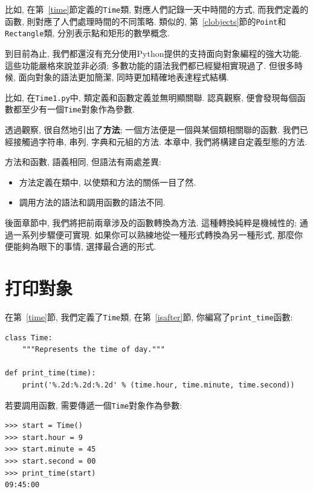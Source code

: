 \documentclass[10pt]{book}
\begin{document}
比如, 在第~\ref{time}節定義的{\tt Time}類, 對應人們記錄一天中時間的方式, 
而我們定義的函數, 則對應了人們處理時間的不同策略. 
類似的, 第~\ref{clobjects}節的{\tt Point}和{\tt Rectangle}類, 
分別表示點和矩形的數學概念. 

到目前為止, 我們都還沒有充分使用Python提供的支持面向對象編程的強大功能. 
這些功能嚴格來說並非必須;
多數功能的語法我們都已經變相實現過了. 
但很多時候, 面向對象的語法更加簡潔, 同時更加精確地表達程式結構. 

比如, 在{\tt Time1.py}中, 類定義和函數定義並無明顯關聯. 
認真觀察, 便會發現每個函數都至少有一個{\tt Time}對象作為參數. 

透過觀察, 很自然地引出了{\bf 方法};
一個方法便是一個與某個類相關聯的函數. 
我們已經接觸過字符串, 串列, 字典和元組的方法. 
本章中, 我們將構建自定義型態的方法. 

方法和函數, 語義相同, 但語法有兩處差異:

\begin{itemize}

\item 方法定義在類中, 以使類和方法的關係一目了然. 

\item 調用方法的語法和調用函數的語法不同. 

\end{itemize}

後面章節中, 我們將把前兩章涉及的函數轉換為方法. 
這種轉換純粹是機械性的; 通過一系列步驟便可實現. 
如果你可以熟練地從一種形式轉換為另一種形式, 
那麼你便能夠為眼下的事情, 選擇最合適的形式. 

\section{打印對象}

在第~\ref{time}節, 我們定義了{\tt Time}類, 在第~\ref{isafter}節, 
你編寫了\verb"print_time"函數:

\begin{verbatim}
class Time:
    """Represents the time of day."""

def print_time(time):
    print('%.2d:%.2d:%.2d' % (time.hour, time.minute, time.second))
\end{verbatim}
%
若要調用函數, 需要傳遞一個{\tt Time}對象作為參數:

\begin{verbatim}
>>> start = Time()
>>> start.hour = 9
>>> start.minute = 45
>>> start.second = 00
>>> print_time(start)
09:45:00
\end{verbatim}
%
\end{document}
